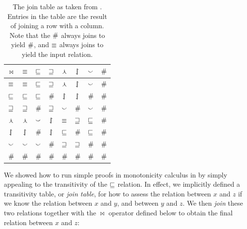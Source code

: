 \begin{table}[t]
	\begin{center}
	\begin{tabular}{|c||c|c|c|c|c|c|c|}
    \hline
    $\bowtie$ & $\equiv$ & $\sqsubseteq$ & $\sqsupseteq$ & $\curlywedge$ & $\downharpoonleft\hspace{-1.25mm}\upharpoonright$ & $\smallsmile$ & $\#$ \\
    \hline
    $\equiv$ & $\equiv$ & $\sqsubseteq$ & $\sqsupseteq$ & $\curlywedge$ & $\downharpoonleft\hspace{-1.25mm}\upharpoonright$ & $\smallsmile$ & $\#$ \\
    $\sqsubseteq$ & $\sqsubseteq$ & $\sqsubseteq$ & $\#$ & $\downharpoonleft\hspace{-1.25mm}\upharpoonright$ & $\downharpoonleft\hspace{-1.25mm}\upharpoonright$ & $\#$ & $\#$ \\
    $\sqsupseteq$ & $\sqsupseteq$ & $\#$ & $\sqsupseteq$ & $\smallsmile$ & $\#$ & $\smallsmile$ & $\#$  \\
    $\curlywedge$ & $\curlywedge$ & $\smallsmile$ & $\downharpoonleft\hspace{-1.25mm}\upharpoonright$ & $\equiv$ & $\sqsupseteq$ & $\sqsubseteq$ & $\#$  \\
    $\downharpoonleft\hspace{-1.25mm}\upharpoonright$ & $\downharpoonleft\hspace{-1.25mm}\upharpoonright$ & $\#$ & $\downharpoonleft\hspace{-1.25mm}\upharpoonright$ & $\sqsubseteq$ & $\#$ & $\sqsubseteq$ & $\#$  \\
    $\smallsmile$ & $\smallsmile$ & $\smallsmile$ & $\#$ & $\sqsupseteq$ & $\sqsupseteq$ & $\#$ & $\#$  \\
    $\#$ & $\#$ & $\#$ & $\#$ & $\#$ & $\#$ & $\#$ & $\#$ \\
    \hline
	\end{tabular}
	\caption{
    The join table as taken from .
    Entries in the table are the result of joining a row with a
      column.
    Note that the $\#$ always joins to yield $\#$,
    and $\equiv$ always joins to yield the input relation.
		\label{tab:natlog-jointable}
	}
	\end{center}
\end{table}



We showed how to run simple proofs in monotonicity calculus in 
   by simply appealing to the transitivity of the
  $\sqsubseteq$ relation.
In effect, we implicitly defined a transitivity table, or \textit{join table},
  for how to assess the relation between $x$ and $z$ if we know the relation
  between $x$ and $y$, and between $y$ and $z$.
We then \textit{join} these two relations together with the $\bowtie$ operator defined
  below to obtain the final relation between $x$ and $z$:
	

